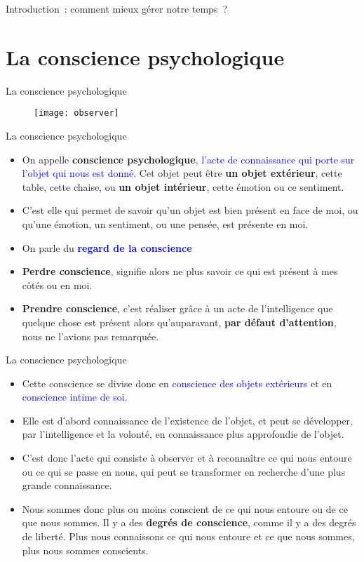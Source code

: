 \documentclass[11pt,xcolor=dvipsname,ignorenonframetext,handout]{beamer}
\begin{document}
\begin{frame}{Introduction~: comment mieux gérer notre temps~?}
\section{La conscience psychologique}
\begin{frame}{La conscience psychologique}
    {
        \begin{figure}
          \centering
          \texttt{[image: observer]}
        \end{figure}
          }    
\end{frame}
\begin{frame}{La conscience psychologique}
    \begin{itemize}
        \rightskip=0pt\leftskip=0pt
        \item On appelle \textbf{conscience psychologique}, \textcolor{blue}{l'acte de connaissance qui porte sur l'objet qui nous est donné}. Cet objet peut être \textbf{un objet extérieur}, cette table, cette chaise, ou \textbf{un objet intérieur}, cette émotion ou ce sentiment.
        \item C'est elle qui permet de savoir qu'un objet est bien présent en face de moi, ou qu'une émotion, un sentiment, ou une pensée, est présente en moi.
        \item On parle du \textcolor{blue}{\textbf{regard de la conscience}}
        \item \textbf{Perdre conscience}, signifie alors ne plus savoir ce qui est présent à mes côtés ou en moi.
        \item \textbf{Prendre conscience}, c'est réaliser grâce à un acte de l'intelligence que quelque chose est présent alors qu'auparavant, \textbf{par défaut d'attention}, nous ne l'avions pas remarquée.
    \end{itemize}
\end{frame}
\begin{frame}{La conscience psychologique}
    \begin{itemize}
        \rightskip=0pt\leftskip=0pt
        \item Cette conscience se divise donc en \textcolor{blue}{conscience des objets extérieurs} et en \textcolor{blue}{conscience intime de soi}.
        \item Elle est d'abord connaissance de l'existence de l'objet, et peut se développer, par l'intelligence et la volonté, en connaissance plus approfondie de l'objet.
        \item C'est donc l'acte qui consiste à observer et à reconnaître ce qui nous entoure ou ce qui se passe en nous, qui peut se transformer en recherche d'une plus grande connaissance.
        \item Nous sommes donc plus ou moins conscient de ce qui nous entoure ou de ce que nous sommes. Il y a des \textbf{degrés de conscience}, comme il y a des degrés de liberté. Plus nous connaissons ce qui nous entoure et ce que nous sommes, plus nous sommes conscients.
    \end{itemize}
\end{frame}

\end{frame}
\end{document}
